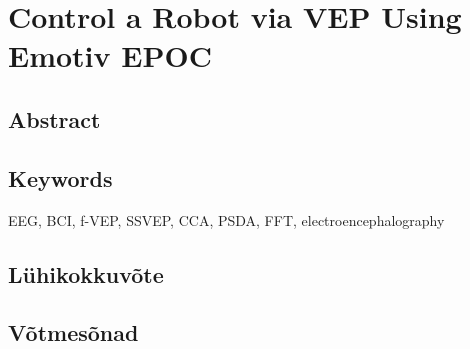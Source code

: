 
\chapter*{Control a Robot via VEP Using Emotiv EPOC}
\section*{Abstract}
\section*{Keywords}
\normalsize{EEG, BCI, f-VEP, SSVEP, CCA, PSDA, FFT, electroencephalography}
\section*{Lühikokkuvõte}
\section*{Võtmesõnad}